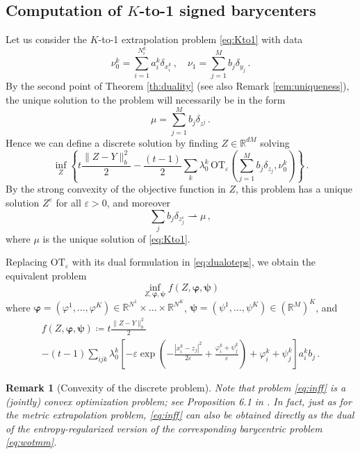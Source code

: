 \documentclass[12pt]{amsart}
\numberwithin{equation}{section}
\let\mr=\mathrm
\let\bs=\boldsymbol
\theoremstyle{plain}
\newtheorem{remark}[theorem]{Remark}
\theoremstyle{definition}
\begin{document}
\subsection{Computation of $K$-to-1 signed barycenters}\label{sec:Kto1numerical} Let us consider the $K$-to-1 extrapolation problem \eqref{eq:Kto1} with data 
\[
\nu_0^k = \sum_{i=1}^{N^k_i} a_i^k \delta_{x_i^k} \,, \quad \nu_1 = \sum_{j=1}^M b_j \delta_{y_j}\,.
\]
By the second point of Theorem \ref{th:duality} (see also Remark \ref{rem:uniqueness}), the unique solution to the problem will necessarily be in the form 
\[
\mu = \sum_{j=1}^M b_j \delta_{z^j}\,.
\]
Hence we can define a discrete solution by finding $Z \in \mathbb{R}^{dM}$ solving
\begin{equation}\label{eq:Kto1eps}
\inf_Z \left\{ t \frac{\|Z-Y\|^2_b}{2} -  \frac{(t-1)}2 \sum_k \lambda_0^k \,\mr{OT}_\varepsilon \left(\sum_{j=1}^M b_j \delta_{z_j},\nu_0^k\right) \right\}\,.
\end{equation}
By the strong convexity of the objective function in $Z$,  this problem has a unique solution $Z^\varepsilon$ for all $\varepsilon>0$, and moreover
\[
\sum_j b_j \delta_{z_j^\varepsilon} \rightharpoonup \mu\,,
\]
where $\mu$ is the unique solution of \eqref{eq:Kto1}. 

Replacing $\mr{OT}_\varepsilon$ with its dual formulation in \eqref{eq:dualoteps}, we obtain the equivalent problem
\begin{equation}\label{eq:inff}
\inf_{Z, \bs{\varphi},\bs{\psi}} f(Z,\bs{\varphi},\bs{\psi})
\end{equation}
where $\bs{\varphi} = (\varphi^1,\ldots,\varphi^K) \in \mathbb{R}^{N^1} \times \ldots\times \mathbb{R}^{N^K}$, $\bs{\psi} = (\psi^1,\ldots,\psi^K) \in (\mathbb{R}^{M})^K$, and
\begin{multline}
f(Z, \bs{\varphi}, \bs{\psi}) \coloneqq  t \frac{\|Z-Y\|^2_b}{2}\\ -  (t-1) \sum_{ijk} \lambda_0^k\left[ - \varepsilon\exp\left( - \frac{|x^k_i -z_j|^2}{2\varepsilon}  + \frac{\varphi^k_i + \psi^k_j}{\varepsilon} \right) + \varphi_i^k  + \psi_j^k \right]a_i^k b_j \,.
\end{multline}

\begin{remark}[Convexity of the discrete problem] \label{rem:convexity} Note that problem \eqref{eq:inff} is a (jointly) convex optimization problem; see Proposition 6.1 in \cite{gallouet2025metric}. In fact, just as for the metric extrapolation problem, \eqref{eq:inff} can also be obtained directly as the dual of the entropy-regularized version of the corresponding barycentric problem \eqref{eq:wotmm}.
\end{remark}
\end{document}
